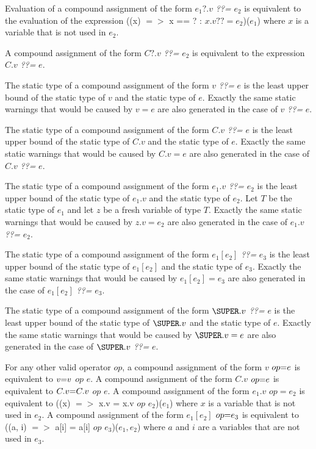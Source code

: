 \documentclass{article}
\newcommand{\code}[1]{{\sf #1}}
\begin{document}
\begin{itemize}
\LMHash{}
Evaluation of a compound assignment of the form $e_1?.v$  {\em ??=} $e_2$ is equivalent to the evaluation of the expression \code{((x) $=>$ x == \NULL{} ?  \NULL: $x.v ??=  e_2$)($e_1$)} where $x$ is a variable that is not used in $e_2$.

\LMHash{}
A compound assignment of the form $C?.v$  {\em ??=} $e_2$ is equivalent to the expression $C.v$ {\em ??=} $e$.

\LMHash{}
The static type of a compound assignment of the form $v$ {\em ??=} $e$ is the least upper bound of the static type of $v$ and the static type of $e$.  Exactly the same static warnings that would be caused by $v = e$ are also generated in the case of $v$ {\em ??=} $e$.


\LMHash{}
The static type of a compound assignment of the form  $C.v$ {\em ??=} $e$  is the least upper bound of the static type of $C.v$ and the static type of $e$.  Exactly the same static warnings that would be caused by $C.v = e$ are also generated in the case of $C.v$ {\em ??=} $e$.

\LMHash{}
The static type of a compound assignment of the form $e_1.v$  {\em ??=} $e_2$ is the least upper bound of the static type of $e_1.v$ and the static type of $e_2$. Let $T$ be the static type of $e_1$ and let $z$ be a fresh variable of type $T$. Exactly the same static warnings that would be caused by $z.v = e_2$ are also generated in the case of $e_1.v$  {\em ??=} $e_2$.

\LMHash{}
The static type of a compound assignment of the form $e_1[e_2]$  {\em ??=} $e_3$  is the least upper bound of the static type of $e_1[e_2]$ and the static type of $e_3$. Exactly the same static warnings that would be caused by $e_1[e_2] = e_3$ are also generated in the case of $e_1[e_2]$  {\em ??=} $e_3$.

\LMHash{}
The static type of a compound assignment of the form $\SUPER.v$  {\em ??=} $e$  is the least upper bound of the static type of $\SUPER.v$ and the static type of $e$. Exactly the same static warnings that would be caused by $\SUPER.v = e$ are also generated in the case of $\SUPER.v$  {\em ??=} $e$.

\LMHash{}
For any other valid operator $op$, a compound assignment of the form $v$ $op\code{=} e$ is equivalent to $v \code{=} v$ $op$ $e$. A compound assignment of the form $C.v$ $op \code{=} e$ is equivalent to $C.v \code{=} C.v$ $op$ $e$. A compound assignment of the form $e_1.v$ $op = e_2$ is equivalent to \code{((x) $=>$ x.v = x.v $op$ $e_2$)($e_1$)} where $x$ is a variable that is not used in $e_2$. A compound assignment of the form  $e_1[e_2]$ $op\code{=} e_3$ is equivalent to
\code{((a, i) $=>$ a[i] = a[i] $op$ $e_3$)($e_1, e_2$)} where $a$ and $i$ are a variables that are not used in $e_3$.


\end{itemize}
\end{document}
